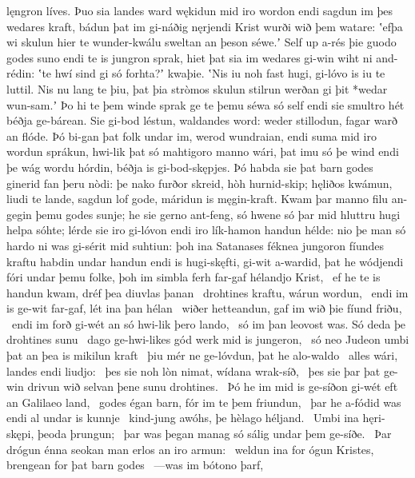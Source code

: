 lęngron líves. \hld\ Þuo sia landes ward
wękidun mid iro wordon \hld\ endi sagdun im þes wedares kraft,
bádun þat im gi-náðig \hld\ nęrjendi Krist
wurði wið þem watare: \hld\ ʽefþa wi skulun hier te wunder-kwálu
sweltan an þeson séwe.ʼ \hld\ Self up a-rés
þie guodo godes suno \hld\ endi te is jungron sprak,
hiet þat sia im wedares gi-win \hld\ wiht ni and-rédin:
ʽte hwí sind gi só forhta?ʼ \hld\ kwaþie. ʽNis iu noh fast hugi,
gi-lóvo is iu te luttil. \hld\ Nis nu lang te þiu,
þat þia stròmos skulun \hld\ stilrun werðan
gi þit *wedar wun-sam.ʼ \hld\ Þo hi te þem winde sprak
ge te þemu séwa só self \hld\ endi sie smultro hét
béðja ge-bárean. \hld\ Sie gi-bod léstun,
waldandes word: \hld\ weder stillodun,
fagar warð an flóde. \hld\ Þó bi-gan þat folk undar im,
werod wundraian, \hld\ endi suma mid iro wordun sprákun,
hwi-lik þat só mahtigoro \hld\ manno wári,
þat imu só þe wind endi þe wág \hld\ wordu hórdin,
béðja is gi-bod-skępjes. \hld\ Þó habda sie þat barn godes
ginerid fan þeru nòdi: \hld\ þe nako furðor skreid,
hòh hurnid-skip; \hld\ hęliðos kwámun,
liudi te lande, \hld\ sagdun lof gode,
máridun is męgin-kraft. \hld\ Kwam þar manno filu
an-gegin þemu godes sunje; \hld\ he sie gerno ant-feng,
só hwene só þar mid hluttru hugi \hld\ helpa sóhte;
lérde sie iro gi-lóvon \hld\ endi iro lík-hamon
handun hélde: \hld\ nio þe man só hardo ni was
gi-sérit mid suhtiun: \hld\ þoh ina Satanases
féknea jungoron \hld\ fíundes kraftu
habdin undar handun \hld\ endi is hugi-skęfti,
gi-wit a-wardid, \hld\ þat he wódjendi
fóri undar þemu folke, \hld\ þoh im simbla ferh far-gaf
hélandjo Krist, \hld\ ef he te is handun kwam,
dréf þea diuvlas þanan \hld\ drohtines kraftu,
wárun wordun, \hld\ endi im is ge-wit far-gaf,
lét ina þan hélan \hld\ wiðer hetteandun,
gaf im wið þie fíund friðu, \hld\ endi im forð gi-wét
an só hwi-lik þero lando, \hld\ só im þan leovost was.
Só deda þe drohtines sunu \hld\ dago ge-hwi-likes
gód werk mid is jungeron, \hld\ só neo Judeon umbi þat
an þea is mikilun kraft \hld\ þiu mér ne ge-lóvdun,
þat he alo-waldo \hld\ alles wári,
landes endi liudjo: \hld\ þes sie noh lòn nimat,
wídana wrak-síð, \hld\ þes sie þar þat ge-win drivun
wið selvan þene sunu drohtines. \hld\ Þó he im mid is ge-síðon gi-wét
eft an Galilaeo land, \hld\ godes égan barn,
fór im te þem friundun, \hld\ þar he a-fódid was
endi al undar is kunnje \hld\ kind-jung awóhs,
þe hèlago héljand. \hld\ Umbi ina hęri-skępi,
þeoda þrungun; \hld\ þar was þegan manag
só sálig undar þem ge-síðe. \hld\ Þar drógun énna seokan man
erlos an iro armun: \hld\ weldun ina for ógun Kristes,
brengean for þat barn godes \hld\ —was im bótono þarf,

